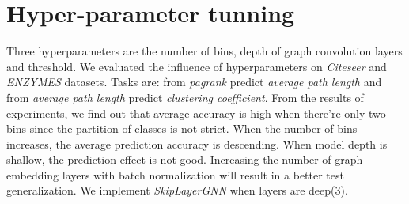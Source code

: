 \documentclass[runningheads]{llncs}
\begin{document}
  \section{Hyper-parameter tunning}
  \vspace{-0.3cm}
  Three hyperparameters are the number of bins, depth of graph convolution layers and threshold. We evaluated the influence of hyperparameters on \textit{Citeseer} and \textit{ENZYMES} datasets. Tasks are: from \textit{pagrank} predict \textit{average path length} and from \textit{average path length} predict \textit{clustering coefficient}. From the results of experiments, we find out that average accuracy is high when there're only two bins since the partition of classes is not strict. When the number of bins increases, the average prediction accuracy is descending. When model depth is shallow, the prediction effect is not good. Increasing the number of graph embedding layers with batch normalization will result in a better test generalization. We implement \textit{SkipLayerGNN} \cite{li2019deepgcns} when layers are deep(3). 
\end{document}
